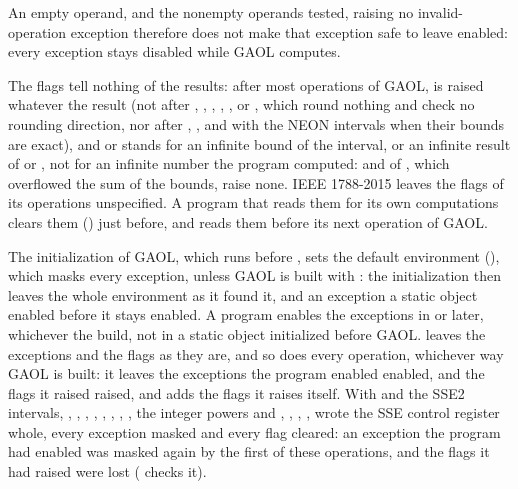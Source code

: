 \documentclass[12pt,a4paper,twoside,openright]{book}
\begin{document}
\noindent
An empty operand, and the nonempty operands tested, raising no
invalid-operation exception therefore does not make that exception safe to
leave enabled: every exception stays disabled while GAOL computes.\newinvfive

\medskip
The flags tell nothing of the results: after most operations of GAOL,
 is raised whatever the result (not after
, , \code{\&}, \code{|}, ,  or
, which round nothing and check no rounding direction, nor after
\code{+}, \code{-}, \code{/} and  with the NEON intervals when
their bounds are exact), and  or 
stands for an infinite bound of the interval, or an infinite result of
 or , not for an infinite number the program
computed:  and  of
, which overflowed the sum of the
bounds, raise none. IEEE 1788-2015 \cite{IEEE1788:2015} leaves the flags of
its operations unspecified. A program that reads them for its own
computations clears them () just
before, and reads them before its next operation of GAOL.\newinvfive

\medskip
The initialization of GAOL, which runs before , sets the default
environment (), which masks every exception,
unless GAOL is built with : the
initialization then leaves the whole environment as it found it, and an
exception a static object enabled before it stays enabled. A program enables
the exceptions in  or later, whichever the build, not in a
static object initialized before GAOL.  leaves the exceptions
and the flags as they are, and so does every operation, whichever way GAOL is
built: it leaves the exceptions the program enabled enabled, and the flags it
raised raised, and adds the flags it raises itself. With
 and the SSE2 intervals, \code{+}, \code{-},
\code{*}, \code{/}, \code{\%}, , ,
, the integer powers and , ,
, ,  wrote the SSE control register whole,
every exception masked and every flag cleared: an exception the program had
enabled was masked again by the first of these operations, and the flags it
had raised were lost ( checks
it).\newinvfive
\end{document}
